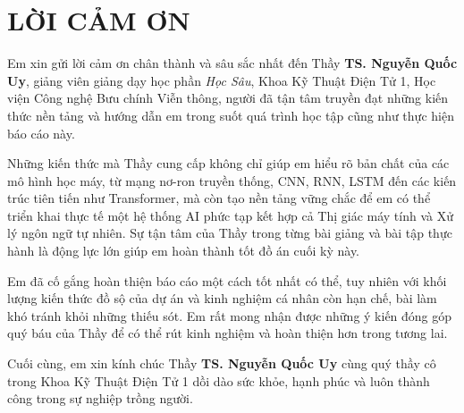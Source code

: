 ﻿\documentclass{article}
\numberwithin{equation}{section}
\numberwithin{figure}{section}
\numberwithin{table}{section}
\begin{document}
\renewcommand{\labelitemi}{--} 
\renewcommand{\labelitemii}{-}


\setcounter{page}{1}

\section*{LỜI CẢM ƠN}

Em xin gửi lời cảm ơn chân thành và sâu sắc nhất đến Thầy \textbf{TS. Nguyễn Quốc Uy}, giảng viên giảng dạy học phần \textit{Học Sâu}, Khoa Kỹ Thuật Điện Tử 1, Học viện Công nghệ Bưu chính Viễn thông, người đã tận tâm truyền đạt những kiến thức nền tảng và hướng dẫn em trong suốt quá trình học tập cũng như thực hiện báo cáo này.

Những kiến thức mà Thầy cung cấp không chỉ giúp em hiểu rõ bản chất của các mô hình học máy, từ mạng nơ-ron truyền thống, CNN, RNN, LSTM đến các kiến trúc tiên tiến như Transformer, mà còn tạo nền tảng vững chắc để em có thể triển khai thực tế một hệ thống AI phức tạp kết hợp cả Thị giác máy tính và Xử lý ngôn ngữ tự nhiên. Sự tận tâm của Thầy trong từng bài giảng và bài tập thực hành là động lực lớn giúp em hoàn thành tốt đồ án cuối kỳ này.

Em đã cố gắng hoàn thiện báo cáo một cách tốt nhất có thể, tuy nhiên với khối lượng kiến thức đồ sộ của dự án và kinh nghiệm cá nhân còn hạn chế, bài làm khó tránh khỏi những thiếu sót. Em rất mong nhận được những ý kiến đóng góp quý báu của Thầy để có thể rút kinh nghiệm và hoàn thiện hơn trong tương lai.

Cuối cùng, em xin kính chúc Thầy \textbf{TS. Nguyễn Quốc Uy} cùng quý thầy cô trong Khoa Kỹ Thuật Điện Tử 1 dồi dào sức khỏe, hạnh phúc và luôn thành công trong sự nghiệp trồng người.

\newpage

{}
\tableofcontents

\newpage

{}
\renewcommand{\listfigurename}{DANH MỤC HÌNH ẢNH}
{\let\oldnumberline\numberline
\renewcommand{\numberline}{Hình~\oldnumberline}
\listoffigures}

\newpage
\end{document}
